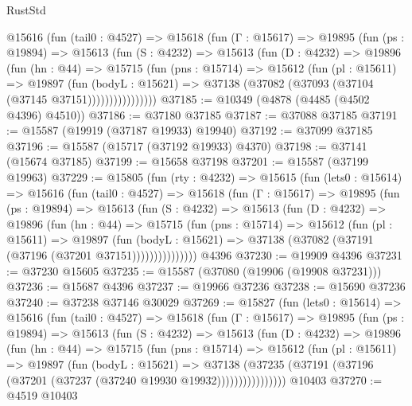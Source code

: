 \begin{lexlean}{RustStd}
\begin{coremodule}
        @15616
          (fun (tail0 : @4527) =>
          @15618
            (fun (Γ : @15617) =>
            @19895
              (fun (ps : @19894) =>
              @15613
                (fun (S : @4232) =>
                @15613
                  (fun (D : @4232) =>
                  @19896
                    (fun (hn : @44) =>
                    @15715
                      (fun (pns : @15714) =>
                      @15612
                        (fun (pl : @15611) =>
                        @19897
                          (fun (bodyL : @15621) =>
                          @37138 (@37082 (@37093 (@37104 (@37145 @37151))))))))))))))))
@37185 := @10349 (@4878 (@4485 (@4502 @4396) @4510))
@37186 := @37180 @37185
@37187 := @37088 @37185
@37191 := @15587 (@19919 (@37187 @19933) @19940)
@37192 := @37099 @37185
@37196 := @15587 (@15717 (@37192 @19933) @4370)
@37198 := @37141 (@15674 @37185)
@37199 := @15658 @37198
@37201 := @15587 (@37199 @19963)
@37229 := @15805
    (fun (rty : @4232) =>
    @15615
      (fun (lets0 : @15614) =>
      @15616
        (fun (tail0 : @4527) =>
        @15618
          (fun (Γ : @15617) =>
          @19895
            (fun (ps : @19894) =>
            @15613
              (fun (S : @4232) =>
              @15613
                (fun (D : @4232) =>
                @19896
                  (fun (hn : @44) =>
                  @15715
                    (fun (pns : @15714) =>
                    @15612
                      (fun (pl : @15611) =>
                      @19897
                        (fun (bodyL : @15621) =>
                        @37138 (@37082 (@37191 (@37196 (@37201 @37151)))))))))))))))
    @4396
@37230 := @19909 @4396
@37231 := @37230 @15605
@37235 := @15587 (@37080 (@19906 (@19908 @37231)))
@37236 := @15687 @4396
@37237 := @19966 @37236
@37238 := @15690 @37236
@37240 := @37238 @37146 @30029
@37269 := @15827
    (fun (lets0 : @15614) =>
    @15616
      (fun (tail0 : @4527) =>
      @15618
        (fun (Γ : @15617) =>
        @19895
          (fun (ps : @19894) =>
          @15613
            (fun (S : @4232) =>
            @15613
              (fun (D : @4232) =>
              @19896
                (fun (hn : @44) =>
                @15715
                  (fun (pns : @15714) =>
                  @15612
                    (fun (pl : @15611) =>
                    @19897
                      (fun (bodyL : @15621) =>
                      @37138
                        (@37235
                          (@37191 (@37196 (@37201 (@37237 (@37240 @19930 @19932))))))))))))))))
    @10403
@37270 := @4519 @10403

\end{coremodule}
\end{lexlean}
